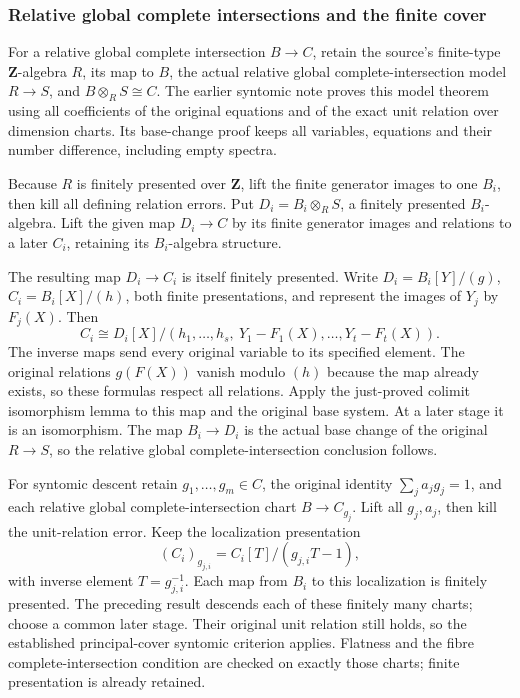\subsubsection{Relative global complete intersections and the finite cover}\label{relative-global-complete-intersections-and-the-finite-cover}

For a relative global complete intersection \(B\to C\), retain the source's finite-type \(\mathbf Z\)-algebra \(R\), its map to \(B\), the actual relative global complete-intersection model \(R\to S\), and \(B\otimes_RS\cong C\). The earlier syntomic note proves this model theorem using all coefficients of the original equations and of the exact unit relation over dimension charts. Its base-change proof keeps all variables, equations and their number difference, including empty spectra.

Because \(R\) is finitely presented over \(\mathbf Z\), lift the finite generator images to one \(B_i\), then kill all defining relation errors. Put \(D_i=B_i\otimes_RS\), a finitely presented \(B_i\)-algebra. Lift the given map \(D_i\to C\) by its finite generator images and relations to a later \(C_i\), retaining its \(B_i\)-algebra structure.

The resulting map \(D_i\to C_i\) is itself finitely presented. Write \(D_i=B_i[Y]/(g)\), \(C_i=B_i[X]/(h)\), both finite presentations, and represent the images of \(Y_j\) by \(F_j(X)\). Then \[
C_i\cong D_i[X]/(h_1,\ldots,h_s,\ Y_1-F_1(X),\ldots,Y_t-F_t(X)).
\] The inverse maps send every original variable to its specified element. The original relations \(g(F(X))\) vanish modulo \((h)\) because the map already exists, so these formulas respect all relations. Apply the just-proved colimit isomorphism lemma to this map and the original base system. At a later stage it is an isomorphism. The map \(B_i\to D_i\) is the actual base change of the original \(R\to S\), so the relative global complete-intersection conclusion follows.

For syntomic descent retain \(g_1,\ldots,g_m\in C\), the original identity \(\sum_j a_jg_j=1\), and each relative global complete-intersection chart \(B\to C_{g_j}\). Lift all \(g_j,a_j\), then kill the unit-relation error. Keep the localization presentation \[
(C_i)_{g_{j,i}}=C_i[T]/(g_{j,i}T-1),
\] with inverse element \(T=g_{j,i}^{-1}\). Each map from \(B_i\) to this localization is finitely presented. The preceding result descends each of these finitely many charts; choose a common later stage. Their original unit relation still holds, so the established principal-cover syntomic criterion applies. Flatness and the fibre complete-intersection condition are checked on exactly those charts; finite presentation is already retained.

